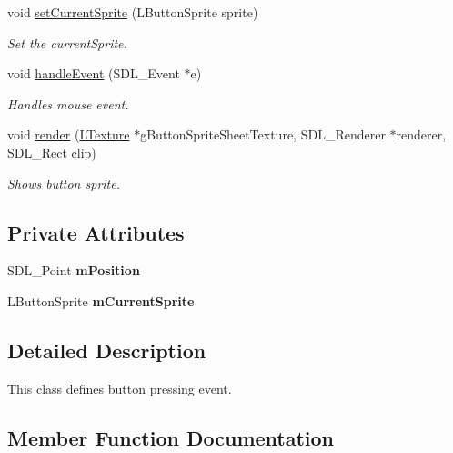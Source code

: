 \begin{DoxyCompactItemize}
\mbox{\label{class_l_button_ad85f821617ca2c845f6e392ddb93947e}} 
void \mbox{\hyperlink{class_l_button_ad85f821617ca2c845f6e392ddb93947e}{set\+Current\+Sprite}} (L\+Button\+Sprite sprite)
\begin{DoxyCompactList}\small\item\em Set the current\+Sprite. \end{DoxyCompactList}\item 
\mbox{\label{class_l_button_a6dd54388797d4059315988878d376d55}} 
void \mbox{\hyperlink{class_l_button_a6dd54388797d4059315988878d376d55}{handle\+Event}} (S\+D\+L\+\_\+\+Event $\ast$e)
\begin{DoxyCompactList}\small\item\em Handles mouse event. \end{DoxyCompactList}\item 
void \mbox{\hyperlink{class_l_button_a84decaa2be3fd3d74a74dd7bd86ae0b0}{render}} (\mbox{\hyperlink{class_l_texture}{L\+Texture}} $\ast$g\+Button\+Sprite\+Sheet\+Texture, S\+D\+L\+\_\+\+Renderer $\ast$renderer, S\+D\+L\+\_\+\+Rect clip)
\begin{DoxyCompactList}\small\item\em Shows button sprite. \end{DoxyCompactList}\end{DoxyCompactItemize}
\subsection*{Private Attributes}
\begin{DoxyCompactItemize}
\item 
\mbox{\label{class_l_button_a7472a4a6b056d295445c49c809c73184}} 
S\+D\+L\+\_\+\+Point {\bfseries m\+Position}
\item 
\mbox{\label{class_l_button_af394679a0757b83e291864dddd2d6d0f}} 
L\+Button\+Sprite {\bfseries m\+Current\+Sprite}
\end{DoxyCompactItemize}


\subsection{Detailed Description}
This class defines button pressing event. 

\subsection{Member Function Documentation}
\mbox{\label{class_l_button_a84decaa2be3fd3d74a74dd7bd86ae0b0}} 
